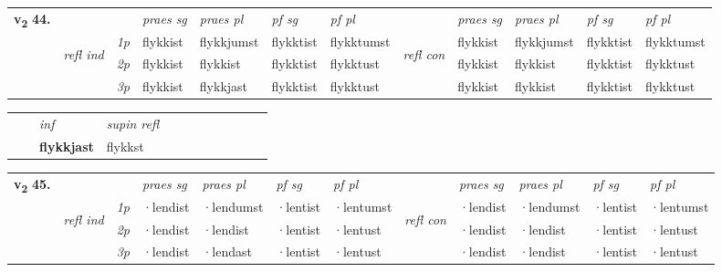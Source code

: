 \begin{tabular}{llllllllllll} \toprule
\multirow{4}{*}{{{\textbf{v{\textsubscript{2}}} \Large{\textbf{44.}}}}}  & &   &  \textit{praes sg}  & \textit{praes pl}  &\textit{pf sg} & \textit{pf pl} &  &  \textit{praes sg}  & \textit{praes pl}  & \textit{pf sg} & \textit{pf pl } \\*
	\cmidrule{4-7} \cmidrule{9-12}
 &\multirow{3}{*}{\begin{turn}{90}\textit{refl ind}\end{turn}} & {\textit{1p}} & flykkist & flykkjumst    & flykktist & flykktumst & \multirow{3}{*}{\begin{turn}{90}\textit{refl con}\end{turn}}  &flykkist & flykkjumst & flykktist & flykktumst\\*
 &&  {\textit{2p}} &  flykkist  & flykkist   & flykktist & flykktust & &flykkist & flykkist & flykktist & flykktust \\*
& &  {\textit{3p}} & flykkist & flykkjast   & flykktist & flykktust & & flykkist & flykkist& flykktist & flykktust  \\*
\cmidrule{4-7} \cmidrule{9-12}
\end{tabular}


\begin{tabular}{llllllllllll}
 & & \textit{inf}       & \textit{supin refl}      \\*
  & & \textbf{flykkjast}        & flykkst  \\*
\cmidrule{1-12}
\end{tabular}



\begin{tabular}{llllllllllll} \toprule
\multirow{4}{*}{{{\textbf{v{\textsubscript{2}}} \Large{\textbf{45.}}}}}  & &   &  \textit{praes sg}  & \textit{praes pl}  &\textit{pf sg} & \textit{pf pl} &  &  \textit{praes sg}  & \textit{praes pl}  & \textit{pf sg} & \textit{pf pl } \\*
	\cmidrule{4-7} \cmidrule{9-12}
 &\multirow{3}{*}{\begin{turn}{90}\textit{refl ind}\end{turn}} & {\textit{1p}} & ·lendist & ·lendumst    & ·lentist & ·lentumst & \multirow{3}{*}{\begin{turn}{90}\textit{refl con}\end{turn}}  &·lendist & ·lendumst & ·lentist & ·lentumst\\*
 &&  {\textit{2p}} &  ·lendist  & ·lendist   & ·lentist & ·lentust & &·lendist & ·lendist & ·lentist & ·lentust \\*
& &  {\textit{3p}} & ·lendist & ·lendast   & ·lentist & ·lentust & & ·lendist & ·lendist& ·lentist & ·lentust  \\*
\cmidrule{4-7} \cmidrule{9-12}
\end{tabular}


